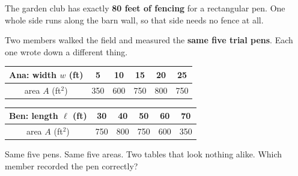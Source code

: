 \documentclass[10pt]{article}
\begin{document}
\vspace{0.1in}

\boxguard[24]
\begin{hookbox}
The garden club has exactly \textbf{80 feet of fencing} for a rectangular pen.
One whole side runs along the barn wall, so that side needs no fence at all.

\smallskip
Two members walked the field and measured the \textbf{same five trial pens}.
Each one wrote down a different thing.

\smallskip
\renewcommand{\arraystretch}{1.3}
\begin{center}
\begin{tabular}{|c|c|c|c|c|c|}
\hline
\textbf{Ana:} width $w$ (ft) & 5 & 10 & 15 & 20 & 25 \\
\hline
area $A$ (ft$^2$) & 350 & 600 & 750 & 800 & 750 \\
\hline
\end{tabular}

\smallskip
\begin{tabular}{|c|c|c|c|c|c|}
\hline
\textbf{Ben:} length $\ell$ (ft) & 30 & 40 & 50 & 60 & 70 \\
\hline
area $A$ (ft$^2$) & 750 & 800 & 750 & 600 & 350 \\
\hline
\end{tabular}
\end{center}

\smallskip
Same five pens. Same five areas. Two tables that look nothing alike. Which
member recorded the pen correctly?
\end{hookbox}

\vspace{0.1in}
\end{document}
